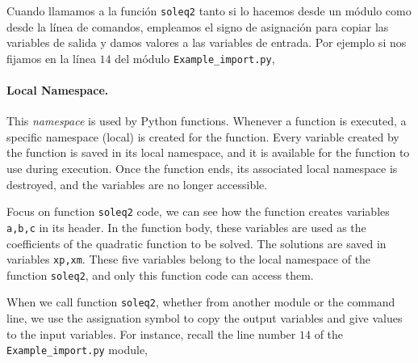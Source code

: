 \begin{paracol}{2}
Cuando llamamos a la función \texttt{soleq2} tanto si lo hacemos desde un módulo como desde la línea de comandos, empleamos el signo de asignación para copiar las variables de salida y damos valores a las variables de entrada. Por ejemplo si nos fijamos en la línea $14$ del módulo \texttt{Example_import.py},
\switchcolumn
\paragraph{Local Namespace.} This \emph{namespace} is used by Python functions. Whenever a function is executed, a specific namespace (local) is created for the function. Every variable created by the function is saved in its local namespace, and it is available for the function to use during execution. Once the function ends, its associated local namespace is destroyed, and the variables are no longer accessible.

Focus on function \texttt{soleq2} code, we can see how the function creates variables \texttt{a,b,c} in its header. In the function body, these variables are used as the coefficients of the quadratic function to be solved. The solutions are saved in variables \texttt{xp,xm}. These five variables belong to the local namespace of the function \texttt{soleq2}, and only this function code can access them. 

When we call function \texttt{soleq2}, whether from another module or the command line, we use the assignation symbol to copy the output variables and give values to the input variables. For instance, recall the line number $14$ of the \texttt{Example_import.py} module,
\end{paracol}
